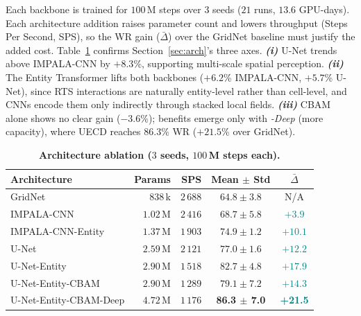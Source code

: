 \documentclass[conference]{IEEEtran}
\newcommand{\code}[1]{{\ttfamily\hyphenchar\font=45\relax #1}}
\begin{document}
Each backbone is trained for $100$\,M steps over $3$ seeds ($21$ runs, $13.6$ GPU-days). Each architecture addition raises parameter count and lowers throughput (Steps Per Second, SPS), so the WR gain ($\bar{\Delta}$) over the GridNet baseline must justify the added cost. Table~\ref{tab:arch-ablation-summary} confirms Section~\ref{sec:arch}'s three axes. \textbf{\emph{(i)}} U-Net trends above IMPALA-CNN by $+8.3$\%, supporting multi-scale spatial perception. \textbf{\emph{(ii)}} The Entity Transformer lifts both backbones ($+6.2$\% IMPALA-CNN, $+5.7$\% U-Net), since RTS interactions are naturally entity-level rather than cell-level, and CNNs encode them only indirectly through stacked local fields. \textbf{\emph{(iii)}} CBAM alone shows no clear gain ($-3.6$\%); benefits emerge only with \emph{-Deep} (more capacity), where \code{UECD} reaches $86.3$\% WR ($+21.5$\% over GridNet).

\begin{table}[!b]
\centering
\caption{\textbf{Architecture ablation ($3$ seeds, $100$\,M steps each).}}
\label{tab:arch-ablation-summary}
\footnotesize
\setlength{\tabcolsep}{3.5pt}
\begin{tabularx}{\linewidth}{@{}X | r r | c c@{}}
\toprule
\textbf{Architecture} & \textbf{Params} & \textbf{SPS} & \textbf{Mean $\pm$ Std} & \textbf{$\bar{\Delta}$} \\
\midrule
GridNet                & $838$\,k  & $2\,688$ & $64.8 \pm 3.8$          & N/A \\
IMPALA-CNN~\cite{espeholtIMPALAScalableDistributed2018}                 & $1.02$\,M & $2\,416$ & $68.7 \pm 5.8$          & \textcolor{teal}{$+3.9$} \\
IMPALA-CNN-Entity          & $1.37$\,M & $1\,903$ & $74.9 \pm 1.2$          & \textcolor{teal}{$+10.1$} \\
U-Net                  & $2.59$\,M & $2\,121$ & $77.0 \pm 1.6$          & \textcolor{teal}{$+12.2$} \\
U-Net-Entity           & $2.90$\,M & $1\,518$ & $82.7 \pm 4.8$          & \textcolor{teal}{$+17.9$} \\
U-Net-Entity-CBAM      & $2.90$\,M & $1\,289$ & $79.1 \pm 7.2$          & \textcolor{teal}{$+14.3$} \\
U-Net-Entity-CBAM-Deep & $4.72$\,M & $1\,176$ & \textbf{86.3 $\pm$ 7.0} & \textcolor{teal}{\textbf{+21.5}} \\
\bottomrule
\end{tabularx}
\end{table}
\end{document}
